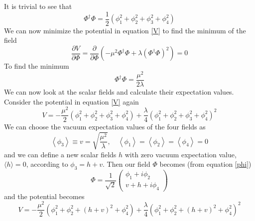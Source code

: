 \documentclass[11pt]{article}
\begin{document}
{It is trivial to see that 
\begin{equation}
    \Phi^{\dagger} \Phi=\frac{1}{2}\left(\phi_{1}^{2}+\phi_{2}^{2}+\phi_{3}^{2}+\phi_{4}^{2}\right)
\end{equation}
We can now minimize the potential in equation \ref{V} to find the minimum of the field
\begin{equation}
    \frac{\partial V}{\partial \Phi} = \frac{\partial }{\partial \Phi} (-\mu^{2} \Phi^{\dagger} \Phi+\lambda\left(\Phi^{\dagger} \Phi\right)^{2}) = 0
\end{equation}
To find the minimum 
\begin{equation}
    \Phi^{\dagger} \Phi=\frac{\mu^{2}}{2 \lambda}
\end{equation}
We can now look at the scalar fields and calculate their expectation values. Consider the potential in equation \ref{V} again
\begin{equation}
    V=-\frac{\mu^{2}}{2}\left(\phi_{1}^{2}+\phi_{2}^{2}+\phi_{3}^{2}+\phi_{4}^{2}\right)+\frac{\lambda}{4}\left(\phi_{1}^{2}+\phi_{2}^{2}+\phi_{3}^{2}+\phi_{4}^{2}\right)^{2}
\end{equation}
We can choose the vacuum expectation values of the four fields as 
\begin{equation}
    \left\langle\phi_{3}\right\rangle \equiv v=\sqrt{\frac{\mu^{2}}{\lambda}}, \quad\left\langle\phi_{1}\right\rangle=\left\langle\phi_{2}\right\rangle=\left\langle\phi_{4}\right\rangle=0
\end{equation}
and we can define a new scalar fields $h$ with zero vacuum expectation value, $\langle h\rangle=0$, according to 
$\phi_{3}=h+v$. Then our field $\Phi$ becomes (from equation \ref{phi})
\begin{equation}
    \Phi=\frac{1}{\sqrt{2}}\left(\begin{array}{c}
\phi_{1}+i \phi_{2} \\
v+h+i \phi_{4}
\end{array}\right)
\end{equation}
and the potential becomes
\begin{equation}
    V=-\frac{\mu^{2}}{2}\left(\phi_{1}^{2}+\phi_{2}^{2}+(h+v)^{2}+\phi_{4}^{2}\right)+\frac{\lambda}{4}\left(\phi_{1}^{2}+\phi_{2}^{2}+(h+v)^{2}+\phi_{4}^{2}\right)^{2}
\end{equation}

}
\end{document}

